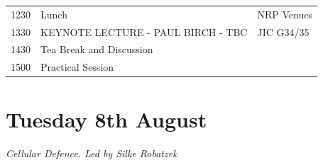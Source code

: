 \documentclass[12pt,]{book}
\begin{document}
\begin{longtable}[]{@{}lll@{}}
\begin{minipage}[t]{0.09\columnwidth}
1230\strut
\end{minipage} & \begin{minipage}[t]{0.39\columnwidth}\raggedright\strut
Lunch\strut
\end{minipage} & \begin{minipage}[t]{0.13\columnwidth}\raggedright\strut
NRP Venues\strut
\end{minipage}\tabularnewline
\begin{minipage}[t]{0.09\columnwidth}\raggedright\strut
1330\strut
\end{minipage} & \begin{minipage}[t]{0.39\columnwidth}\raggedright\strut
KEYNOTE LECTURE - PAUL BIRCH - TBC\strut
\end{minipage} & \begin{minipage}[t]{0.13\columnwidth}\raggedright\strut
JIC G34/35\strut
\end{minipage}\tabularnewline
\begin{minipage}[t]{0.09\columnwidth}\raggedright\strut
1430\strut
\end{minipage} & \begin{minipage}[t]{0.39\columnwidth}\raggedright\strut
Tea Break and Discussion\strut
\end{minipage} & \begin{minipage}[t]{0.13\columnwidth}\raggedright\strut
\strut
\end{minipage}\tabularnewline
\begin{minipage}[t]{0.09\columnwidth}\raggedright\strut
1500\strut
\end{minipage} & \begin{minipage}[t]{0.39\columnwidth}\raggedright\strut
Practical Session\strut
\end{minipage} & \begin{minipage}[t]{0.13\columnwidth}\raggedright\strut
\strut
\end{minipage}\tabularnewline
\bottomrule
\end{longtable}

\section*{Tuesday 8th August}\label{tuesday-8th-august}

\emph{Cellular Defence. Led by Silke Robatzek}
\end{document}
